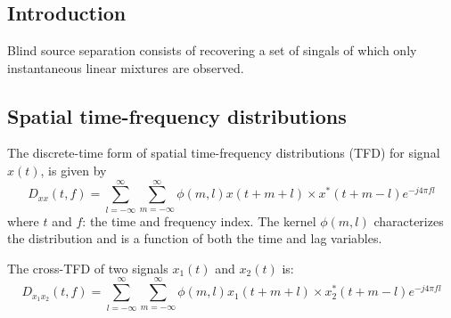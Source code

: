 \renewcommand{\pmk}{Belouchrani\_1998\_IEEEtsp\_Blind source separation}
\renewcommand{\prf}{Others/\pmk.pdf}
\renewcommand{\pti}{Blind source separation based on time-frequency
  signal representations}
\renewcommand{\pay}{Adel Belouchrani and Moeness G. Amin, 1998}
\renewcommand{\pjo}{IEEE Transactions on Signal Processing}
\renewcommand{\pda}{2020/9/13 Sun.}

\section{\pinfo}
\subsection{Introduction}
Blind source separation consists of recovering a set of singals
of which only instantaneous linear mixtures are observed.

\subsection{Spatial time-frequency distributions}
The discrete-time form of spatial time-frequency distributions (TFD)
for signal $ x(t) $, is given by
\[ D_{xx}(t, f) = \sum_{l = - \infty}^{\infty} \sum_{m = - \infty}^{\infty}
  \phi(m, l) x(t + m + l) \times x^{\ast}(t + m - l) e^{ - j 4 \pi f l} \]
where $t$ and $f$: the time and frequency index.
The kernel $\phi(m, l)$ characterizes the distribution and is a function
of both the time and lag variables.

The cross-TFD of two signals $ x_1(t) $ and $ x_2(t) $ is:
\[ D_{x_1 x_2}(t, f) = \sum_{l = - \infty}^{\infty} \sum_{m = - \infty}^{\infty}
  \phi(m, l) x_1(t + m + l) \times x_2^{\ast}(t + m - l) e^{ - j 4 \pi f l} \]

